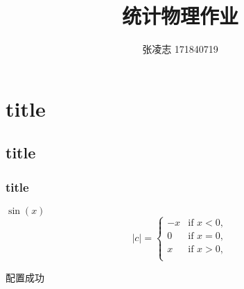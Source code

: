 \documentclass[UTF8,a4paper]{ctexart}
\title{统计物理作业}
\author{张凌志 171840719}
\begin{document}
 
	\maketitle
	\section{title}
	\subsection{title}
	\subsubsection{title}
	$\sin(x)$
	\[
	|c|=
	\begin{cases}
		-x&\text{if } x<0,\\
		0&\text{if } x=0,\\
		x&\text{if } x>0,\\
	\end{cases}
	\]
	\par{配置成功}
\end{document}
